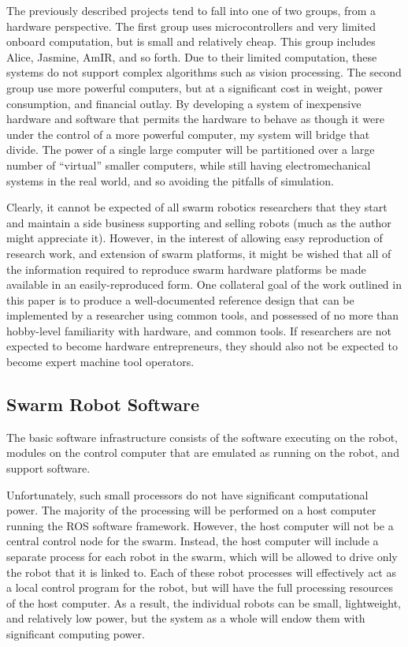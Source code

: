 \documentclass[]{article}
\begin{document}
The previously described projects tend to fall into one of two groups, from a hardware perspective. 
The first group uses microcontrollers and very limited onboard computation, but is small and relatively cheap.
This group includes Alice, Jasmine, AmIR, and so forth.
Due to their limited computation, these systems do not support complex algorithms such as vision processing. 
The second group use more powerful computers, but at a significant cost in weight, power consumption, and financial outlay.
By developing a system of inexpensive hardware and software that permits the hardware to behave as though it were under the control of a more powerful computer, my system will bridge that divide. 
The power of a single large computer will be partitioned over a large number of ``virtual'' smaller computers, while still having electromechanical systems in the real world, and so avoiding the pitfalls of simulation. 

Clearly, it cannot be expected of all swarm robotics researchers that they start and maintain a side business supporting and selling robots (much as the author might appreciate it).
However, in the interest of allowing easy reproduction of research work, and extension of swarm platforms, it might be wished that all of the information required to reproduce swarm hardware platforms be made available in an easily-reproduced form.
One collateral goal of the work outlined in this paper is to produce a well-documented reference design that can be implemented by a researcher using common tools, and possessed of no more than hobby-level familiarity with hardware, and common tools. 
If researchers are not expected to become hardware entrepreneurs, they should also not be expected to become expert machine tool operators.

\subsection{Swarm Robot Software}

The basic software infrastructure consists of the software executing on the robot, modules on the control computer that are emulated as running on the robot, and support software. 

Unfortunately, such small processors do not have significant computational power. 
The majority of the processing will be performed on a host computer running the ROS software framework. 
However, the host computer will not be a central control node for the swarm. 
Instead, the host computer will include a separate process for each robot in the swarm, which will be allowed to drive only the robot that it is linked to. 
Each of these robot processes will effectively act as a local control program for the robot, but will have the full processing resources of the host computer. 
As a result, the individual robots can be small, lightweight, and relatively low power, but the system as a whole will endow them with significant computing power. 
\end{document}
